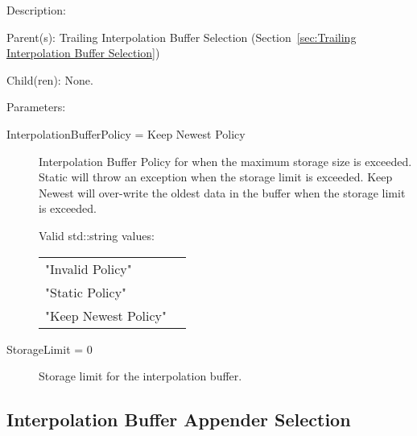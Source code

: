 \begin{list}{}
  {\setlength{\leftmargin}{1.0in}
   \setlength{\labelwidth}{0.75in}
   \setlength{\labelsep}{0.125in}}
  \item[Description:]
  \item[Parent(s):]
    Trailing Interpolation Buffer Selection (Section~\ref{sec:Trailing Interpolation Buffer Selection})
  \item[Child(ren):]
    None. 
  \item[Parameters:]
    \begin{description}
      \item[InterpolationBufferPolicy = Keep Newest Policy] 
Interpolation Buffer Policy for when the maximum storage size is exceeded.  Static will throw an exception when the storage limit is exceeded.  Keep Newest will over-write the oldest data in the buffer when the storage limit is exceeded.

  Valid std::string values:

      \begin{tabular}{lp{}}
      "Invalid Policy" & \\ 
      "Static Policy" & \\ 
      "Keep Newest Policy" & \\ 
      \end{tabular}
      \item[StorageLimit = 0] 
Storage limit for the interpolation buffer.
\end{description}

\end{list}

\subsection{Interpolation Buffer Appender Selection}
\label{sec:Interpolation Buffer Appender Selection}


